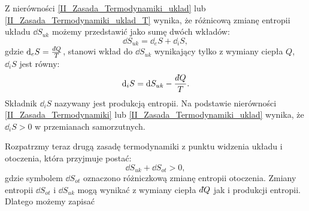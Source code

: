 \documentclass[10pt, a4paper, twoside, onecolumn]{article}
\numberwithin{equation}{section}
\newcommand{\dbar}{d\hspace*{-0.08em}\bar{}\hspace*{0.1em}}
\begin{document}
	Z nierówności \eqref{II_Zasada_Termodynamiki_uklad} lub \eqref{II_Zasada_Termodynamiki_uklad_T} wynika, że różnicową zmianę entropii układu \(\dd{S_{uk}}\) możemy przedstawić jako sumę dwóch wkładów:
	\begin{equation}
		\dd{S_{uk}}=\dd_{e}S+\dd_{i}S,
	\end{equation}
	gdzie \(\dd_{e}S=\frac{\dbar Q}{T}\), stanowi wkład do \(\dd{S_{uk}}\) wynikający tylko z wymiany ciepła \(Q\), \(\dd_{i}S\) jest równy:
	\begin{equation}
		\dd_{i}S=\dd{S_{uk}}-\frac{\dbar Q}{T}.
	\end{equation}
	Składnik \(\dd_{i}S\) nazywany jest produkcją entropii. Na podstawie nierówności \eqref{II_Zasada_Termodynamiki} lub \eqref{II_Zasada_Termodynamiki_uklad} wynika, że \(\dd_{i}S>0\) w przemianach samorzutnych. \par
	Rozpatrzmy teraz drugą zasadę termodynamiki z punktu widzenia układu i otoczenia, która przyjmuje postać:
	\begin{equation}\label{II_Zasada_Termodynamiki_uklad_i_otoczenie}
		\dd{S_{uk}}+\dd{S_{ot}}>0,
	\end{equation}
	gdzie symbolem \(\dd{S_{ot}}\) oznaczono różniczkową zmianę entropii otoczenia. Zmiany entropii \(\dd{S_{ot}}\) i \(\dd{S_{uk}}\) mogą wynikać z wymiany ciepła \(\dbar Q\) jak i produkcji entropii. Dlatego możemy zapisać
	
\end{document}
